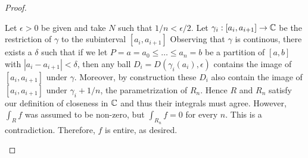 \documentclass[10pt]{amsart}
\begin{document}
\begin{thm}
\begin{proof}
\begin{alphaenum}
      Let $\epsilon > 0$ be given and take $N$ such that $1/n < \epsilon/2$.
      Let $\gamma_i:[a_i,a_{i+1}]\rightarrow \mathbb{C}$ be the restriction of $\gamma$ to the subinterval $[a_i,a_{i+1}]$
      Observing that $\gamma$ is continous, there exists a $\delta$ such that if we let $P = a = a_0 \leq \ldots \leq a_n = b$ be a partition of $[a,b]$ with $|a_i - a_{i+1}| < \delta$, then any ball $D_i = D(\gamma_i(a_i),\epsilon)$ contains the image of $[a_i,a_{i+1}]$ under $\gamma$.
      Moreover, by construction these $D_i$ also contain the image of $[a_i,a_{i+1}]$ under $\gamma_i + 1/n$, the parametrization of $R_n$.
      Hence $R$ and $R_n$ satisfy our definition of closeness in $\mathbb{C}$ and thus their integrals must agree.
      However, $\int_R f$ was assumed to be non-zero, but $\int_{R_n}f = 0$ for every $n$.
      This is a contradiction.
      Therefore, $f$ is entire, as desired.
    \item
      \frownie
    \end{alphaenum}
  \end{proof}
\end{thm}
\end{document}
